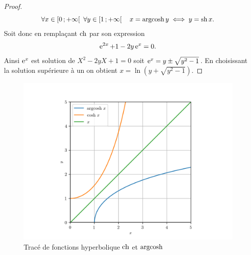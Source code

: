 \begin{proof}
    \begin{equation}
        \forall x \in \Rplus \ \forall y \in \intervallefo{1}{+\infty} \quad 
        x=\argch y \iff y=\hsin x.
    \end{equation}
    Soit donc en remplaçant \(\operatorname{ch}\) par son expression
    \begin{equation}
        \operatorname{e}^{2x} +1 - 2y\operatorname{e}^x =0.
    \end{equation}
    Ainsi \(\operatorname{e}^x\) est solution de \(X^2-2yX+1=0\) soit \(\operatorname{e}^x = y \pm 
    \sqrt{y^2-1}\). En choisissant la solution supérieure à un on obtient 
    \(x=\ln \left(y+\sqrt{y^2-1} \right)\).
\end{proof}
\begin{figure}
    \centering
    \includegraphics[scale=0.8]{argcosh.png}
    \caption{Tracé de fonctions hyperbolique \(\operatorname{ch}\) et \(\operatorname{argcosh}\)}
    \label{fig:tracecoshargcosh}
\end{figure}
